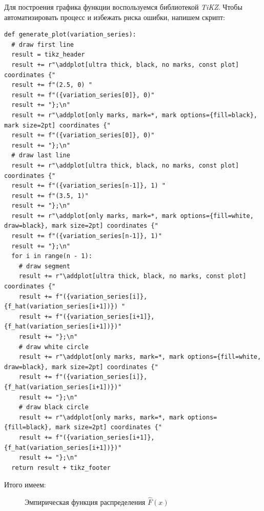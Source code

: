 Для построения графика функции воспользуемся библиотекой \textit{TiKZ}. Чтобы автоматизировать процесс и избежать риска ошибки, напишем скрипт:
\begin{lstlisting}[caption=Функция построения графика]
def generate_plot(variation_series):
  # draw first line
  result = tikz_header
  result += r"\addplot[ultra thick, black, no marks, const plot] coordinates {"
  result += f"(2.5, 0) "
  result += f"({variation_series[0]}, 0)"
  result += "};\n"
  result += r"\addplot[only marks, mark=*, mark options={fill=black}, mark size=2pt] coordinates {"
  result += f"({variation_series[0]}, 0)"
  result += "};\n"
  # draw last line
  result += r"\addplot[ultra thick, black, no marks, const plot] coordinates {"
  result += f"({variation_series[n-1]}, 1) "
  result += f"(3.5, 1)"
  result += "};\n"
  result += r"\addplot[only marks, mark=*, mark options={fill=white, draw=black}, mark size=2pt] coordinates {"
  result += f"({variation_series[n-1]}, 1)"
  result += "};\n"
  for i in range(n - 1):
    # draw segment
    result += r"\addplot[ultra thick, black, no marks, const plot] coordinates {"
    result += f"({variation_series[i]}, {f_hat(variation_series[i+1])}) "
    result += f"({variation_series[i+1]}, {f_hat(variation_series[i+1])})"
    result += "};\n"
    # draw white circle
    result += r"\addplot[only marks, mark=*, mark options={fill=white, draw=black}, mark size=2pt] coordinates {"
    result += f"({variation_series[i]}, {f_hat(variation_series[i+1])})"
    result += "};\n"
    # draw black circle
    result += r"\addplot[only marks, mark=*, mark options={fill=black}, mark size=2pt] coordinates {"
    result += f"({variation_series[i+1]}, {f_hat(variation_series[i+1])})"
    result += "};\n"
  return result + tikz_footer
\end{lstlisting}

Итого имеем:

\begin{figure}[h!]
\centering

\caption{Эмпирическая функция распределения $\hat{F}(x)$}
\end{figure}